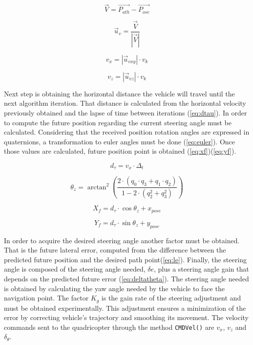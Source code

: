 \documentclass{styles/svproc}
\begin{document}
	\begin{equation}
	\vec{V} = \vec{P_{ath}} - \vec{P_{ose}}
	\label{eq:vecv}
	\end{equation}
	
	\begin{equation}
	\vec{u}_{v} = \frac{\vec{V}}{|\vec{V}|}
	\label{eq:uv}
	\end{equation}
	
	\begin{equation}
	v_{x} = |\vec{u}_{vxy}| \cdot v_{k}
	\label{eq:vxy}
	\end{equation}
	
	\begin{equation}
	v_{z} = |\vec{u}_{vz}| \cdot v_{k}
	\label{eq:vz}
	\end{equation}
	
	Next step is obtaining the horizontal distance the vehicle will travel until the next algorithm iteration. That distance is calculated from the horizontal velocity previously obtained and the lapse of time between iterations (\ref{eq:dtau}). In order to compute the future position regarding the current steering angle must be calculated. Considering that the received position rotation angles are expressed in quaternions, a transformation to euler angles must be done (\ref{eq:euler}). Once those values are calculated, future position point is obtained (\ref{eq:xf})(\ref{eq:yf}).
	
	\begin{equation}
	d_{\tau} = v_{x} \cdot \Delta_{t}
	\label{eq:dtau}
	\end{equation}

	\begin{equation}
	\theta_{z} = \arctan^2 \left( \frac{2 \cdot (q_{0} \cdot q_{3} +q_{1} \cdot q_{2})}{1-2 \cdot (q_{2}^2 + q_{3}^2)}\right)
	\label{eq:euler}
	\end{equation}		
	
	\begin{equation}
	X_{f} = d_{\tau} \cdot \cos \theta_{z} + x_{pose}
	\label{eq:xf}
	\end{equation}
	
	\begin{equation}
	Y_{f} = d_{\tau} \cdot \sin \theta_{z} + y_{pose}
	\label{eq:yf}
	\end{equation}
	
	In order to acquire the desired steering angle another factor must be obtained. That is the future lateral error, computed from the difference between the predicted future position and the desired path point(\ref{eq:le}). Finally, the steering angle is composed of the steering angle needed, $\delta{e}$, plus a steering angle gain that depends on the predicted future error (\ref{eq:deltatheta}). The steering angle needed is obtained by calculating the yaw angle needed by the vehicle to face the navigation point. The factor $K_{g}$ is the gain rate of the steering adjustment and must be obtained experimentally. This adjustment ensures a minimization of the error by correcting vehicle's trajectory and smoothing its movement. The velocity commands sent to the quadricopter through the method \texttt{CMDVel()} are $v_{x}$, $v_{z}$ and $\delta_{\theta}$. 
\end{document}
